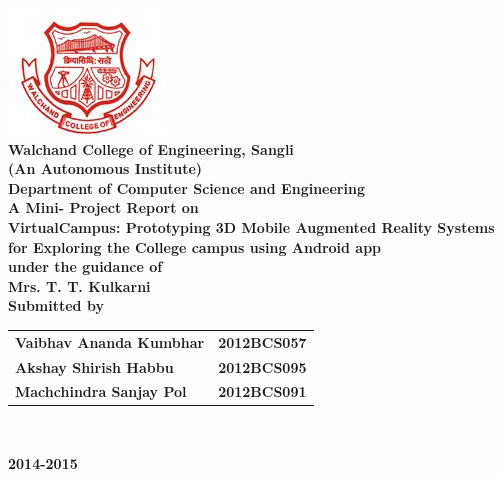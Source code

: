 \documentclass{article}
\begin{document}
	
\begin{titlepage}
{
	\begin{center}
		\includegraphics[width=.2\linewidth]{walchand.jpg}\\[.5cm]
		\textbf{\Large Walchand College of Engineering, Sangli }\\
		\textbf {(An Autonomous Institute)}\\[.5cm]
		 \textbf {\LARGE Department of Computer Science and Engineering}\\[1.5cm]
		{ \large \textbf{ A  Mini- Project Report on} }\\[.5cm]
		\textbf{\Large VirtualCampus: Prototyping 3D Mobile Augmented Reality Systems for Exploring the College campus 	using Android app}\\[1cm]
		\large  \textbf{under the guidance of}\\[.3cm]
		\Large \textbf{Mrs. T. T. Kulkarni  }\\[1cm]
		\large \textbf {Submitted by}\\[.5cm]
{\setlength{\tabcolsep}{30pt}
\renewcommand{\arraystretch}{1.5}
		\begin{tabular}{ll}
			\large\textbf{Vaibhav Ananda Kumbhar } & \large\textbf{2012BCS057} 
				\\
			\large \textbf{Akshay Shirish Habbu }&\large\textbf{2012BCS095}
				\\
			\large\textbf{Machchindra Sanjay Pol} & \large\textbf{2012BCS091}
				\\
		\end{tabular}\\[1.5cm]
}

		\vfill
		\large \textbf{2014-2015 }\\[.4cm]
	\end{center}
}
\end{titlepage}
\end{document}
